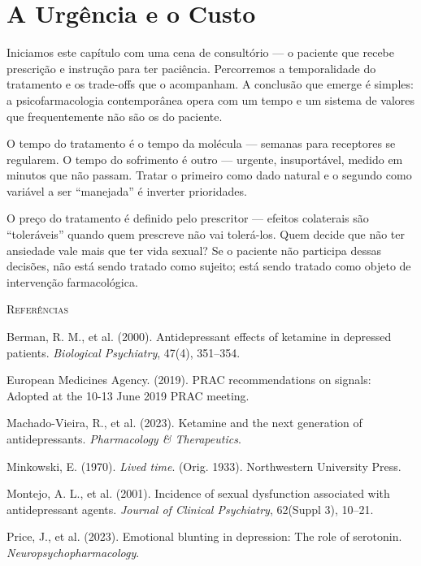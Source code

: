 \section{A Urgência e o Custo}
\label{sec:urgencia-custo}

Iniciamos este capítulo com uma cena de consultório --- o paciente que recebe prescrição e instrução para ter paciência. Percorremos a temporalidade do tratamento e os trade-offs que o acompanham. A conclusão que emerge é simples: a psicofarmacologia contemporânea opera com um tempo e um sistema de valores que frequentemente não são os do paciente.

O tempo do tratamento é o tempo da molécula --- semanas para receptores se regularem. O tempo do sofrimento é outro --- urgente, insuportável, medido em minutos que não passam. Tratar o primeiro como dado natural e o segundo como variável a ser \enquote{manejada} é inverter prioridades.

O preço do tratamento é definido pelo prescritor --- efeitos colaterais são \enquote{toleráveis} quando quem prescreve não vai tolerá-los. Quem decide que não ter ansiedade vale mais que ter vida sexual? Se o paciente não participa dessas decisões, não está sendo tratado como sujeito; está sendo tratado como objeto de intervenção farmacológica.

\vspace{2em}
\begin{small}
\noindent\textsc{Referências}

\vspace{1em}
\noindent Berman, R. M., et al. (2000). Antidepressant effects of ketamine in depressed patients. \textit{Biological Psychiatry}, 47(4), 351--354.

\noindent European Medicines Agency. (2019). PRAC recommendations on signals: Adopted at the 10-13 June 2019 PRAC meeting.

\noindent Machado-Vieira, R., et al. (2023). Ketamine and the next generation of antidepressants. \textit{Pharmacology \& Therapeutics}.

\noindent Minkowski, E. (1970). \textit{Lived time}. (Orig. 1933). Northwestern University Press.

\noindent Montejo, A. L., et al. (2001). Incidence of sexual dysfunction associated with antidepressant agents. \textit{Journal of Clinical Psychiatry}, 62(Suppl 3), 10--21.

\noindent Price, J., et al. (2023). Emotional blunting in depression: The role of serotonin. \textit{Neuropsychopharmacology}.
\end{small}
